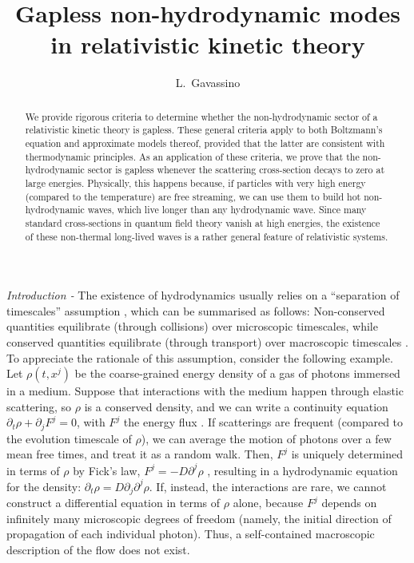 \documentclass[a4paper, amsfonts, amssymb, amsmath, reprint, showkeys, nofootinbib, twoside, onecolumn,notitlepage,,longbibliography]{revtex4-2}
\theoremstyle{definition}
\theoremstyle{theorem}
\theoremstyle{corollary}
\begin{document}
\title{Gapless non-hydrodynamic modes in relativistic kinetic theory}
\author{L.~Gavassino}



\begin{abstract}
We provide rigorous criteria to determine whether the non-hydrodynamic sector of a relativistic kinetic theory is gapless. These general criteria apply to both Boltzmann's equation and approximate models thereof, provided that the latter are consistent with thermodynamic principles. As an application of these criteria, we prove that the non-hydrodynamic sector is gapless whenever the scattering cross-section decays to zero at large energies. Physically, this happens because, if particles with very high energy (compared to the temperature) are free streaming, we can use them to build hot non-hydrodynamic waves, which live longer than any hydrodynamic wave. Since many standard cross-sections in quantum field theory vanish at high energies, the existence of these non-thermal long-lived waves is a rather general feature of relativistic systems. 
\end{abstract} 



\maketitle

\noindent \textit{Introduction -} The existence of hydrodynamics usually relies on a ``separation of timescales'' assumption \cite{Kadanoff1963,huang_book,LindblomRelaxation1996,Hohenberg1977,Denicol2012Boltzmann,Hydro+2018,GavassinoFronntiers2021,Rocha:2023ilf}, which can be summarised as follows: Non-conserved quantities equilibrate (through collisions) over microscopic timescales, while conserved quantities equilibrate (through transport) over macroscopic timescales \cite{Glorioso2018}. To appreciate the rationale of this assumption, consider the following example. Let $\rho(t,x^j)$ be the coarse-grained energy density of a gas of photons immersed in a medium. Suppose that interactions with the medium happen through elastic scattering, so $\rho$ is a conserved density, and we can write a continuity equation $\partial_t \rho +\partial_j F^j=0$, with $F^j$ the energy flux \cite{Levermore1984}. If scatterings are frequent (compared to the evolution timescale of $\rho$), we can average the motion of photons over a few mean free times, and treat it as a random walk. Then, $F^j$ is uniquely determined in terms of $\rho$ by Fick's law, $F^j=-D\partial^j \rho$ \cite{mihalas_book}, resulting in a hydrodynamic equation for the density: $\partial_t \rho=D \partial_j \partial^j \rho$. If, instead, the interactions are rare, we cannot construct a differential equation in terms of $\rho$ alone, because $F^j$ depends on infinitely many microscopic degrees of freedom (namely, the initial direction of propagation of each individual photon). Thus, a self-contained macroscopic description of the flow does not exist.
\end{document}
